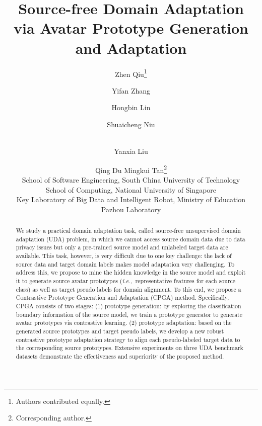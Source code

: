 \documentclass{article}
\title{Source-free Domain Adaptation \\via Avatar Prototype Generation and Adaptation}
\author{
Zhen Qiu\thanks{Authors contributed equally.} \and
Yifan Zhang\and
Hongbin Lin\and
Shuaicheng Niu\and
\\
Yanxia Liu\and
Qing Du\And
Mingkui Tan\thanks{Corresponding author.}\\
\affiliations
School of Software Engineering, South China University of Technology\\
School of Computing, National University of Singapore\\
Key Laboratory of Big Data and Intelligent Robot, Ministry of Education\\
Pazhou Laboratory\\
}
\def\ie{\emph{i.e.,~}}
\begin{document}
\maketitle

\begin{abstract}


We study a practical domain adaptation task, called source-free unsupervised domain adaptation (UDA) problem, in which we cannot access source domain data due to data privacy issues but only a pre-trained source model and unlabeled target data are available.  This task, however, is very difficult due to one key challenge: the lack of source data and target domain labels makes model adaptation very challenging. To address this, we propose to mine the hidden knowledge in the source model and exploit it to generate
source avatar prototypes (\ie representative features for each source class) as well as target pseudo labels for domain alignment. To this end, we propose a Contrastive Prototype Generation and Adaptation (CPGA) method.
Specifically, CPGA consists of two stages: (1) prototype generation: by exploring the classification boundary information of the source model, we train a prototype generator to generate avatar prototypes via contrastive learning. (2) prototype adaptation: based on the generated source prototypes and target pseudo labels, we develop a new robust contrastive prototype adaptation strategy to align each pseudo-labeled target data to the corresponding source prototypes. Extensive experiments on three UDA benchmark datasets demonstrate the effectiveness and superiority of the proposed method.
\end{abstract}
\end{document}
